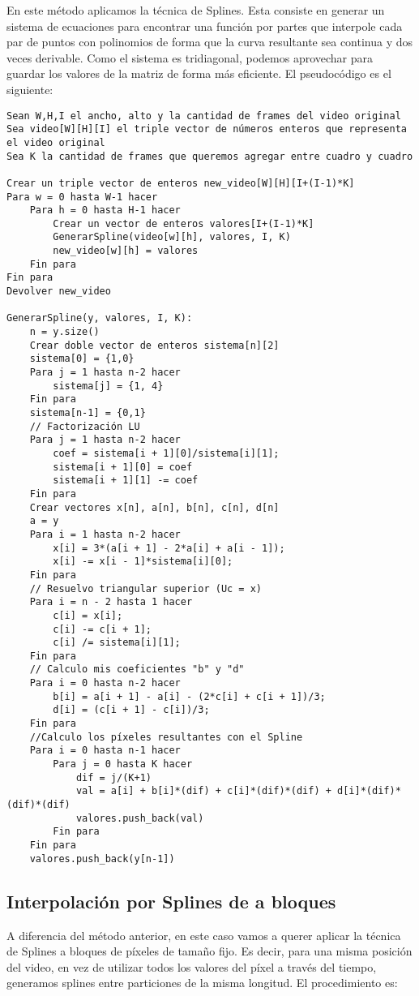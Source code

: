 En este método aplicamos la técnica de Splines. Esta consiste en generar un sistema de ecuaciones para encontrar una función por partes que interpole cada par de puntos con polinomios de forma que la curva resultante sea continua y dos veces derivable. Como el sistema es tridiagonal, podemos aprovechar para guardar los valores de la matriz de forma más eficiente. El pseudocódigo es el siguiente:

\begin{lstlisting}
Sean W,H,I el ancho, alto y la cantidad de frames del video original
Sea video[W][H][I] el triple vector de números enteros que representa el video original
Sea K la cantidad de frames que queremos agregar entre cuadro y cuadro

Crear un triple vector de enteros new_video[W][H][I+(I-1)*K]
Para w = 0 hasta W-1 hacer
	Para h = 0 hasta H-1 hacer
		Crear un vector de enteros valores[I+(I-1)*K]
		GenerarSpline(video[w][h], valores, I, K)
		new_video[w][h] = valores
	Fin para
Fin para
Devolver new_video

GenerarSpline(y, valores, I, K):
	n = y.size()
	Crear doble vector de enteros sistema[n][2]
	sistema[0] = {1,0}
	Para j = 1 hasta n-2 hacer
		sistema[j] = {1, 4}
	Fin para
	sistema[n-1] = {0,1}
	// Factorización LU
	Para j = 1 hasta n-2 hacer
		coef = sistema[i + 1][0]/sistema[i][1];
		sistema[i + 1][0] = coef
		sistema[i + 1][1] -= coef
	Fin para
	Crear vectores x[n], a[n], b[n], c[n], d[n]
	a = y
	Para i = 1 hasta n-2 hacer
		x[i] = 3*(a[i + 1] - 2*a[i] + a[i - 1]);
		x[i] -= x[i - 1]*sistema[i][0];
	Fin para
	// Resuelvo triangular superior (Uc = x)
	Para i = n - 2 hasta 1 hacer
		c[i] = x[i];
		c[i] -= c[i + 1];
		c[i] /= sistema[i][1];
	Fin para
	// Calculo mis coeficientes "b" y "d"
	Para i = 0 hasta n-2 hacer
		b[i] = a[i + 1] - a[i] - (2*c[i] + c[i + 1])/3;
		d[i] = (c[i + 1] - c[i])/3;
	Fin para
	//Calculo los píxeles resultantes con el Spline
	Para i = 0 hasta n-1 hacer
		Para j = 0 hasta K hacer
			dif = j/(K+1)
			val = a[i] + b[i]*(dif) + c[i]*(dif)*(dif) + d[i]*(dif)*(dif)*(dif)
			valores.push_back(val)
		Fin para
	Fin para
	valores.push_back(y[n-1])
\end{lstlisting}

\subsection{Interpolación por Splines de a bloques}

A diferencia del método anterior, en este caso vamos a querer aplicar la técnica de Splines a bloques de píxeles de tamaño fijo. Es decir, para una misma posición del video, en vez de utilizar todos los valores del píxel a través del tiempo, generamos splines entre particiones de la misma longitud. El procedimiento es:

